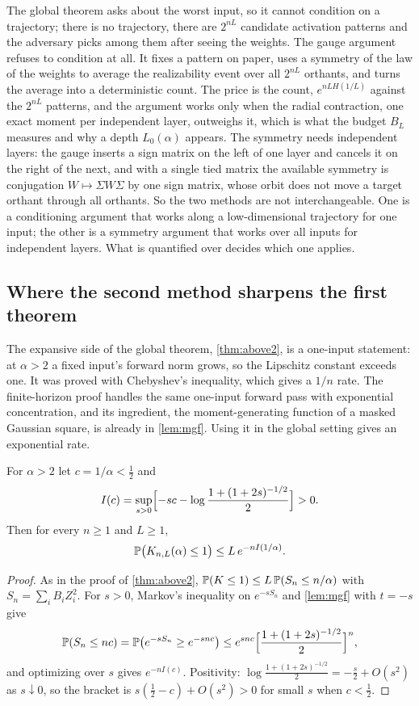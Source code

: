 The global theorem asks about the worst input, so it cannot condition on a trajectory; there is no trajectory, there are $2^{nL}$ candidate activation patterns and the adversary picks among them after seeing the weights. The gauge argument refuses to condition at all. It fixes a pattern on paper, uses a symmetry of the law of the weights to average the realizability event over all $2^{nL}$ orthants, and turns the average into a deterministic count. The price is the count, $e^{nLH(1/L)}$ against the $2^{nL}$ patterns, and the argument works only when the radial contraction, one exact moment per independent layer, outweighs it, which is what the budget $B_L$ measures and why a depth $L_0(\alpha)$ appears. The symmetry needs independent layers: the gauge inserts a sign matrix on the left of one layer and cancels it on the right of the next, and with a single tied matrix the available symmetry is conjugation $W\mapsto\Sigma W\Sigma$ by one sign matrix, whose orbit does not move a target orthant through all orthants. So the two methods are not interchangeable. One is a conditioning argument that works along a low-dimensional trajectory for one input; the other is a symmetry argument that works over all inputs for independent layers. What is quantified over decides which one applies.

\subsection{Where the second method sharpens the first theorem}

The expansive side of the global theorem, \cref{thm:above2}, is a one-input statement: at $\alpha>2$ a fixed input's forward norm grows, so the Lipschitz constant exceeds one. It was proved with Chebyshev's inequality, which gives a $1/n$ rate. The finite-horizon proof handles the same one-input forward pass with exponential concentration, and its ingredient, the moment-generating function of a masked Gaussian square, is already in \cref{lem:mgf}. Using it in the global setting gives an exponential rate.

\begin{corollary}\label{cor:chernoff}
For $\alpha>2$ let $c=1/\alpha<\tfrac12$ and
\[
I(c)=\sup_{s>0}\Bigl[-sc-\log\frac{1+(1+2s)^{-1/2}}2\Bigr]>0 .
\]
Then for every $n\ge1$ and $L\ge1$,
\[
\mathbb{P}\bigl(K_{n,L}(\alpha)\le1\bigr)\le L\,e^{-nI(1/\alpha)} .
\]
\end{corollary}

\begin{proof}
As in the proof of \cref{thm:above2}, $\mathbb{P}(K\le1)\le L\,\mathbb{P}(S_n\le n/\alpha)$ with $S_n=\sum_iB_iZ_i^2$. For $s>0$, Markov's inequality on $e^{-sS_n}$ and \cref{lem:mgf} with $t=-s$ give
\[
\mathbb{P}(S_n\le nc)=\mathbb{P}\bigl(e^{-sS_n}\ge e^{-snc}\bigr)\le e^{snc}\Bigl[\frac{1+(1+2s)^{-1/2}}2\Bigr]^n,
\]
and optimizing over $s$ gives $e^{-nI(c)}$. Positivity: $\log\frac{1+(1+2s)^{-1/2}}2=-\tfrac s2+O(s^2)$ as $s\downarrow0$, so the bracket is $s(\tfrac12-c)+O(s^2)>0$ for small $s$ when $c<\tfrac12$.
\end{proof}

